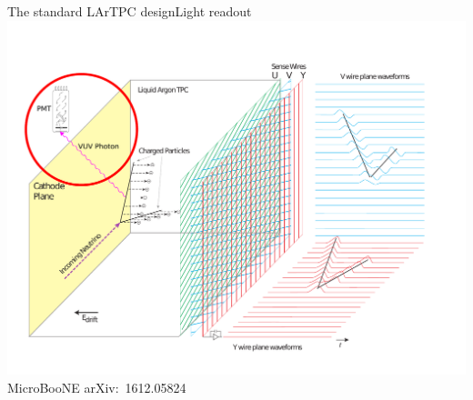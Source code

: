 \documentclass[]{beamer}
\newcommand*{\uboone}{{MicroBooNE}}
\newcommand*{\lartpc}{{LArTPC}}
\begin{document}
\begin{frame}{The standard \lartpc{} design}{Light readout}
	\centering
	\includegraphics[viewport=30 40 720 540, clip, height=.66\textheight]{defence/TPCprinciple_light-ro}\\
	{\tiny \uboone{} arXiv:~1612.05824~\cite{uboone}}\\
\end{frame}
\end{document}
